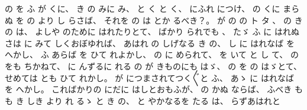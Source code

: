 %
の
を
ふ
が
くに、
%
き
の
みに
み、
%
と
く
と
く、
%
にふれ
につけ、
%
の
くに
まらぬ
を
の
より
し
らさば、
%
それを
の
は
とか
るべき？。
%
が
の
の
ト
タ
、
%
の
き
の
は、
%
よしや
のために
はれたりとて、
%
ばかり
られでも
、
%
たゞ
ふ
に
はれぬ
さは
に
みて
しくおぼゆれば、
%
あはれ
の
しげなる
き
の、
%
し
に
はれなば
を
へかし、
%
ふ
あらば
を
ひて
れよかし、
%
の
に
められて、
%
を
いて
と
し
て、
%
の
をも
ちかねて、
%
に
んずるに
れる
の
が
きものにも
はゞ、
%
の
を
の
はゞとて、
%
せめては
とも
ひて
れかし。
%
が
につまされてつく〴〵と
ふ、
%
あゝ
に
はれなば
を
へかし。
%
こればかりの
にだに
はしとおもふが、
%
の
かぬ
ならば、
%
ふべき
も
も
き
しき
より
れ
るゝ
と
き
の、
%
と
やかなるを
たる
は、
%
らずあはれと
